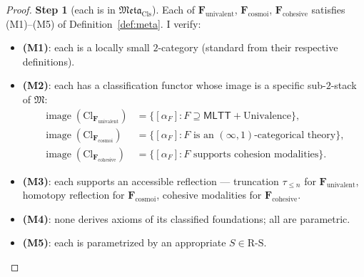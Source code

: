 \documentclass[11pt]{article}
\theoremstyle{plain}
\theoremstyle{definition}
\newcommand{\RS}{\mathrm{R\text{-}S}}
\newcommand{\fM}{\mathfrak{M}}
\newcommand{\Meta}{\mathfrak{Meta}}
\newcommand{\Cl}{\mathrm{Cl}}
\newcommand{\MLTT}{\mathsf{MLTT}}
\DeclareMathOperator{\image}{image}
\begin{document}
\begin{proof}

\textbf{Step 1} (each is in $\Meta_{\mathrm{Cls}}$). Each of $\mathbf{F}_{\mathrm{univalent}}$, $\mathbf{F}_{\mathrm{cosmoi}}$, $\mathbf{F}_{\mathrm{cohesive}}$ satisfies (M1)--(M5) of Definition~\ref{def:meta}. I verify:
\begin{itemize}
\item \textbf{(M1)}: each is a locally small $2$-category (standard from their respective definitions).
\item \textbf{(M2)}: each has a classification functor whose image is a specific sub-$2$-stack of $\fM$:
\begin{align*}
\image(\Cl_{\mathbf{F}_{\mathrm{univalent}}}) &= \{[\alpha_F] : F \supseteq \MLTT + \text{Univalence}\}, \\
\image(\Cl_{\mathbf{F}_{\mathrm{cosmoi}}}) &= \{[\alpha_F] : F \text{ is an } (\infty, 1)\text{-categorical theory}\}, \\
\image(\Cl_{\mathbf{F}_{\mathrm{cohesive}}}) &= \{[\alpha_F] : F \text{ supports cohesion modalities}\}.
\end{align*}
\item \textbf{(M3)}: each supports an accessible reflection --- truncation $\tau_{\leq n}$ for $\mathbf{F}_{\mathrm{univalent}}$, homotopy reflection for $\mathbf{F}_{\mathrm{cosmoi}}$, cohesive modalities for $\mathbf{F}_{\mathrm{cohesive}}$.
\item \textbf{(M4)}: none derives axioms of its classified foundations; all are parametric.
\item \textbf{(M5)}: each is parametrized by an appropriate $S \in \RS$.
\end{itemize}


\end{proof}
\end{document}
